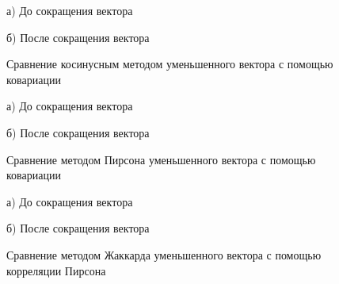 \begin{figure}[H]
    \begin{minipage}[H]{0.5\linewidth}
        а) До сокращения вектора 
    \end{minipage}
    \begin{minipage}[H]{0.5\linewidth}
        б) После сокращения вектора 
    \end{minipage}
    \caption{Сравнение косинусным методом уменьшенного вектора с помощью ковариации}
    \label{fig:heatmapCovCos}
\end{figure}

\begin{figure}[H]
    \begin{minipage}[H]{0.5\linewidth}
        а) До сокращения вектора 
    \end{minipage}
    \begin{minipage}[H]{0.5\linewidth}
        б) После сокращения вектора 
    \end{minipage}
    \caption{Сравнение методом Пирсона уменьшенного вектора с помощью ковариации}
    \label{fig:heatmapCovPear}
\end{figure}

\begin{figure}[H]
    \begin{minipage}[H]{0.5\linewidth}
        а) До сокращения вектора 
    \end{minipage}
    \begin{minipage}[H]{0.5\linewidth}
        б) После сокращения вектора 
    \end{minipage}
    \caption{Сравнение методом Жаккарда уменьшенного вектора с помощью корреляции Пирсона}
    \label{fig:heatmapPearJac}
\end{figure}

